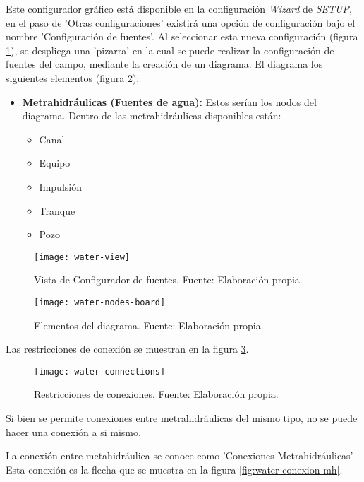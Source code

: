 Este configurador gráfico está disponible en la configuración \textit{Wizard} de \textit{SETUP}, en el paso de 'Otras configuraciones' existirá una opción de configuración bajo el nombre 'Configuración de fuentes'.
Al seleccionar esta nueva configuración (figura \ref{fig:water-view}), se despliega una 'pizarra' en la cual se puede realizar la configuración de fuentes del campo, mediante la creación de un diagrama. El diagrama los siguientes elementos (figura \ref{fig:water-nodes-board}):
\begin{itemize}
    \item \textbf{Metrahidráulicas (Fuentes de agua):} Estos serían los nodos del diagrama. Dentro de las metrahidráulicas disponibles están:
          \begin{itemize}
              \item Canal
              \item Equipo
              \item Impulsión
              \item Tranque
              \item Pozo
          \end{itemize}   
\end{itemize}

\begin{figure}[H]
	\centering
	\texttt{[image: water-view]}
	\caption{\label{fig:water-view} Vista de Configurador de fuentes. Fuente: Elaboración propia.}
\end{figure}

\begin{figure}[H]
	\centering
	\texttt{[image: water-nodes-board]}
	\caption{\label{fig:water-nodes-board} Elementos del diagrama. Fuente: Elaboración propia.}
\end{figure}

Las restricciones de conexión se muestran en la figura \ref{fig:water-connections}.

\begin{figure}[H]
	\centering
	\texttt{[image: water-connections]}
	\caption{\label{fig:water-connections} Restricciones de conexiones. Fuente: Elaboración propia.}
\end{figure}

Si bien se permite conexiones entre metrahidráulicas del mismo tipo, no se puede hacer una conexión a si mismo.

La conexión entre metahidráulica se conoce como 'Conexiones Metrahidráulicas'. Esta conexión es la flecha que se muestra en la figura \ref{fig:water-conexion-mh}.

